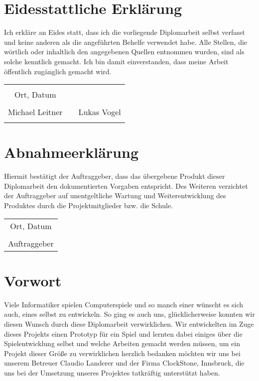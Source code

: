 

\chapter*{Eidesstattliche Erklärung}
Ich erkläre an Eides statt, dass ich die vorliegende Diplomarbeit selbst verfasst und keine anderen als die angeführten Behelfe verwendet habe. Alle Stellen, die wörtlich oder inhaltlich den angegebenen Quellen entnommen wurden, sind als solche kenntlich gemacht.
Ich bin damit einverstanden, dass meine Arbeit öffentlich zugänglich gemacht wird.

\vspace{1cm}
\begin{tabular}{c c c}
	& \hspace{4cm} & \\\cline{1-1}
	Ort, Datum & & \\
	\vspace{2cm}
	& & \\\cline{1-1}\cline{3-3}
	Michael Leitner & & Lukas Vogel \\ 
	\vspace{2cm}

\end{tabular}

\chapter*{Abnahmeerklärung}
Hiermit bestätigt der Auftraggeber, dass das übergebene Produkt dieser Diplomarbeit den dokumentierten Vorgaben entspricht. Des Weiteren verzichtet der Auftraggeber auf unentgeltliche Wartung und Weiterentwicklung des Produktes durch die Projektmitglieder bzw. die Schule.

\vspace{1cm}
\begin{tabular}{c}
	\\\cline{1-1}
	Ort, Datum\\
	\vspace{2cm}
	\\\cline{1-1}
	Auftraggeber
\end{tabular}	

\chapter*{Vorwort}
\def \currentAuthor {Lukas Vogel}
Viele Informatiker spielen Computerspiele und so manch einer wünscht es sich auch, eines selbst zu entwickeln. So ging es auch uns, glücklicherweise konnten wir diesen Wunsch durch diese Diplomarbeit verwirklichen. Wir entwickelten im Zuge dieses Projekts einen Prototyp für ein Spiel und lernten dabei einiges über die Spielentwicklung selbst und welche Arbeiten gemacht werden müssen, um ein Projekt dieser Größe zu verwirklichen
herzlich bedanken möchten wir uns bei unserem Betreuer Claudio Landerer und der Firma ClockStone, Innsbruck, die uns bei der Umsetzung unseres Projektes tatkräftig unterstützt haben.

